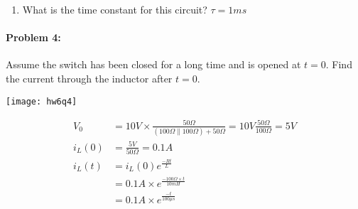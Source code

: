 \documentclass[12pt,letterpaper,titlepage]{article}
\begin{document}
\begin{raggedright}
\begin{enumerate}[label=\alph*)]
\item What is the time constant for this circuit? $\tau = 1ms$
\end{enumerate}


\clearpage

\paragraph{Problem 4: }
Assume the switch has been closed for a long time and is opened at $t = 0$. Find the current through the inductor after $t = 0$.
\begin{center}
\texttt{[image: hw6q4]}
\end{center}

\begin{align*}
V_0 &= 10V \times \frac{50\Omega}{(100\Omega\parallel 100\Omega) + 50\Omega} = 10V\frac{50\Omega}{100\Omega} = 5V
\\ i_L(0) &= \frac{5V}{50\Omega} = 0.1A
\\ i_L(t) &= i_L(0) e^{\frac{-Rt}{L}}
\\        &= 0.1A\times e^{\frac{-100\Omega \times t}{10mH}}
\\        &= 0.1A\times e^{\frac{-t}{100\mu s}}
\end{align*}


\end{raggedright}
\end{document}

